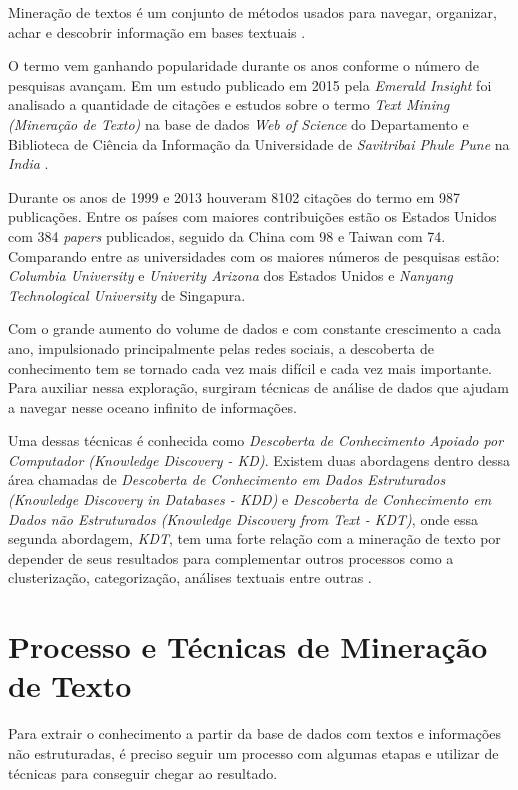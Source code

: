 \documentclass[conference]{IEEEtran}
\begin{document}
Mineração de textos é um conjunto de métodos
usados para navegar, organizar, achar e descobrir
informação em bases textuais \cite{art1}. 

O termo vem ganhando popularidade durante os anos conforme o número de pesquisas avançam.
Em um estudo publicado em 2015 pela \textit{Emerald Insight} foi analisado a quantidade de citações e estudos sobre o termo \textit{Text Mining (Mineração de Texto)} na base de dados \textit{Web of Science} do Departamento e Biblioteca de Ciência da Informação da Universidade de \textit{Savitribai Phule Pune} na \textit{India} \cite{art6}. 

Durante os anos de 1999 e 2013 houveram 8102 citações do termo em 987 publicações. Entre os países com maiores contribuições estão os Estados Unidos com 384 \textit{papers} publicados, seguido da China com 98 e Taiwan com 74. Comparando entre as universidades com os maiores números de pesquisas estão: \textit{Columbia University} e \textit{Univerity Arizona} dos Estados Unidos e \textit{Nanyang Technological University} de Singapura.

Com o grande aumento do volume de dados e com constante crescimento a cada ano, impulsionado principalmente pelas redes sociais, a descoberta de conhecimento tem se tornado cada vez mais difícil e cada vez mais importante. Para auxiliar nessa exploração, surgiram técnicas de análise de dados que ajudam a navegar nesse oceano infinito de informações.

Uma dessas técnicas é conhecida como \textit{Descoberta de Conhecimento Apoiado por Computador (Knowledge Discovery - KD)}. Existem duas abordagens dentro dessa área chamadas de \textit{Descoberta de Conhecimento em Dados Estruturados (Knowledge Discovery in Databases - KDD)} e \textit{Descoberta de Conhecimento em Dados não Estruturados (Knowledge Discovery from Text - KDT)}, onde essa segunda abordagem, \textit{KDT}, tem uma forte relação com a mineração de texto por depender de seus resultados para complementar outros processos como a clusterização, categorização, análises textuais entre outras \cite{art2}.


\section{Processo e Técnicas de Mineração de Texto}\label{tecnicas} 

Para extrair o conhecimento a partir da base de dados com textos e informações não estruturadas, é preciso seguir um processo com algumas etapas e utilizar de técnicas para conseguir chegar ao resultado. 
\end{document}
